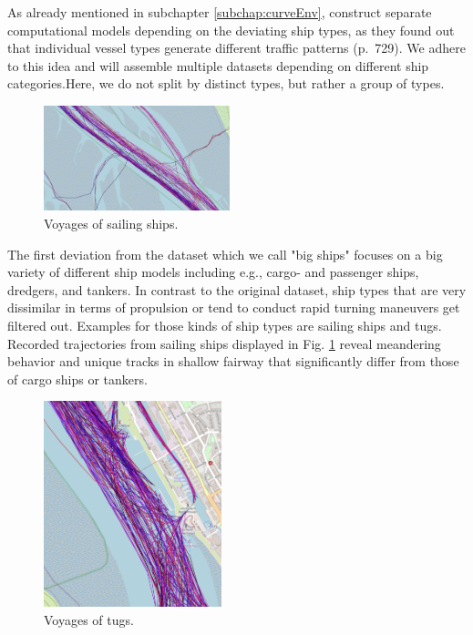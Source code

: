 As already mentioned in subchapter \ref{subchap:curveEnv}, \cite{venskus2021unsupervised} construct separate computational models depending on the deviating ship types, as they found out that individual vessel types generate different traffic patterns (p.~729). We adhere to this idea and will assemble multiple datasets depending on different ship categories.Here, we do not split by distinct types, but rather a group of types. 
\begin{figure}
    \includegraphics[width=0.48\textwidth]{images/ais/tracks/Sailing.png}
    \caption{Voyages of sailing ships.}
    \label{fig:sailing}
\end{figure}
The first deviation from the dataset which we call "big ships" focuses on a big variety of different ship models including e.g., cargo- and passenger ships, dredgers, and tankers.
In contrast to the original dataset, ship types that are very dissimilar in terms of propulsion or tend to conduct rapid turning maneuvers get filtered out. Examples for those kinds of ship types are sailing ships and tugs. Recorded trajectories from sailing ships displayed in Fig. \ref{fig:sailing} reveal meandering behavior and unique tracks in shallow fairway that significantly differ from those of cargo ships or tankers.
\newpage
\begin{figure}
    \includegraphics[width=0.46\textwidth]{images/ais/tracks/Tugs.png}
    \caption{Voyages of tugs.}
    \label{fig:tugs}
\end{figure}

